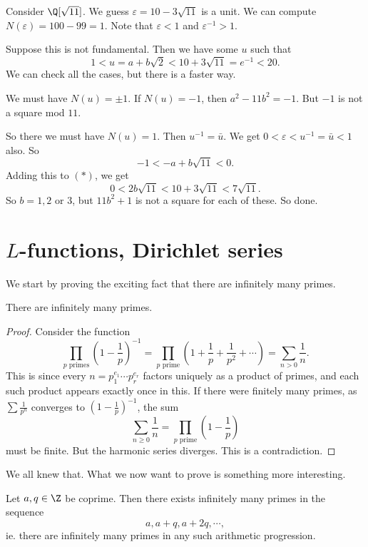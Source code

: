 \documentclass[a4paper]{article}
\begin{document}
\begin{eg}
  Consider $\Q[\sqrt{11}]$. We guess $\varepsilon = 10 - 3\sqrt{11}$ is a unit. We can compute $N(\varepsilon) = 100 - 99 = 1$. Note that $\varepsilon < 1$ and $\varepsilon^{-1} > 1$.

  Suppose this is not fundamental. Then we have some $u$ such that
  \[
    1 < u = a + b\sqrt{2} < 10 + 3\sqrt{11} = e^{-1} < 20.\tag{$*$}
  \]
  We can check all the cases, but there is a faster way.

  We must have $N(u) = \pm 1$. If $N(u) = -1$, then $a^2 - 11b^2 = -1$. But $-1$ is not a square mod $11$.

  So there we must have $N(u) = 1$. Then $u^{-1} = \bar{u}$. We get $0 < \varepsilon < u^{-1} = \bar{u} < 1$ also. So
  \[
    -1 < -a + b\sqrt{11} < 0.
  \]
  Adding this to $(*)$, we get
  \[
    0 < 2b\sqrt{11} < 10 + 3\sqrt{11} < 7\sqrt{11}.
  \]
  So $b = 1, 2$ or $3$, but $11b^2 + 1$ is not a square for each of these. So done.
\end{eg}

\section{\texorpdfstring{$L$}{L}-functions, Dirichlet series}
We start by proving the exciting fact that there are infinitely many primes.
\begin{thm}[Euclid]
  There are infinitely many primes.
\end{thm}

\begin{proof}
  Consider the function
  \[
    \prod_{p\text{ primes}} \left(1 - \frac{1}{p}\right)^{-1} = \prod_{p\text{ prime}}\left(1 + \frac{1}{p} + \frac{1}{p^2} + \cdots\right) = \sum_{n > 0}\frac{1}{n}.
  \]
  This is since every $n = p_1^{e_1} \cdots p_r^{e_r}$ factors uniquely as a product of primes, and each such product appears exactly once in this. If there were finitely many primes, as $\sum \frac{1}{p^n}$ converges to $\left(1 - \frac{1}{p}\right)^{-1}$, the sum
  \[
    \sum_{n \geq 0}\frac{1}{n} = \prod_{p\text{ prime}} \left(1 - \frac{1}{p}\right)
  \]
  must be finite. But the harmonic series diverges. This is a contradiction.
\end{proof}

We all knew that. What we now want to prove is something more interesting.
\begin{thm}
  Let $a, q \in \Z$ be coprime. Then there exists infinitely many primes in the sequence
  \[
    a, a + q, a + 2q, \cdots,
  \]
  ie. there are infinitely many primes in any such arithmetic progression.
\end{thm}
\end{document}
